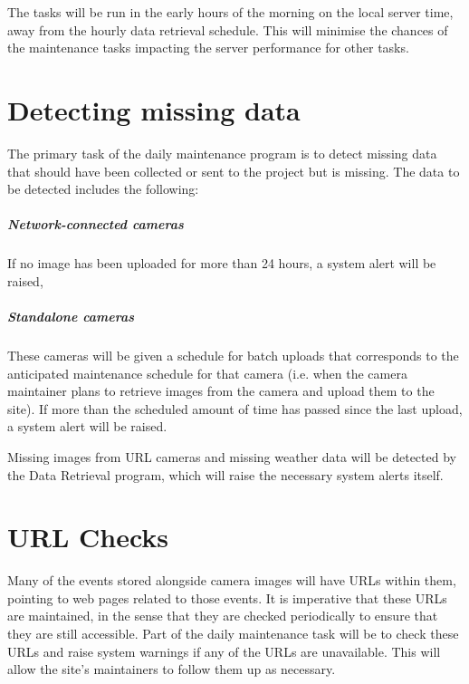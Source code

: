 \documentclass[11pt]{article}
\begin{document}
The tasks will be run in the early hours of the morning on the local server time, away from the hourly data retrieval schedule. This will minimise the chances of the maintenance tasks impacting the server performance for other tasks. 

\section{Detecting missing data}
The primary task of the daily maintenance program is to detect missing data that should have been collected or sent to the project but is missing. The data to be detected includes the following:

\subparagraph{Network-connected cameras} If no image has been uploaded for more than 24 hours, a system alert will be raised,

\subparagraph{Standalone cameras} These cameras will be given a schedule for batch uploads that corresponds to the anticipated maintenance schedule for that camera (i.e. when the camera maintainer plans to retrieve images from the camera and upload them to the site). If more than the scheduled amount of time has passed since the last upload, a system alert will be raised.

Missing images from URL cameras and missing weather data will be detected by the Data Retrieval program, which will raise the necessary system alerts itself.

\section{URL Checks}
Many of the events stored alongside camera images will have URLs within them, pointing to web pages related to those events. It is imperative that these URLs are maintained, in the sense that they are checked periodically to ensure that they are still accessible. Part of the daily maintenance task will be to check these URLs and raise system warnings if any of the URLs are unavailable. This will allow the site's maintainers to follow them up as necessary.
\end{document}
